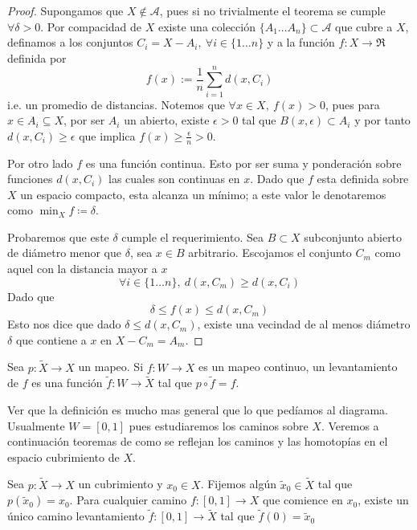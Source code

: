 \begin{proof}
  Supongamos que \(X \not \in \mathcal A\), pues si no trivialmente el
  teorema se cumple \(\forall \delta > 0\). Por compacidad de \(X\)
  existe una colección \(\{A_1 \dotsc A_n\} \subset \mathcal A\) que
  cubre a \(X\), definamos a los conjuntos \(C_i = X - A_i,\ \forall i
  \in \{1 \dotsc n\}\) y a la función \(f : X \to \Re\) definida por
  \[ f(x) := \frac 1 n \sum_{i=1}^{n} d(x, C_i) \]
  i.e. un promedio de distancias. Notemos que \(\forall x
  \in X,\ f(x) > 0\), pues para \(x \in A_i \subseteq X\), por ser
  \(A_i\) un abierto, existe \(\epsilon > 0\) tal que \(B(x,\epsilon)
  \subset A_i\) y por tanto \(d(x, C_i) \geq \epsilon\) que implica \(
  f(x) \geq \frac \epsilon n > 0\).

  Por otro lado \(f\) es una función continua. Esto por ser suma y
  ponderación sobre funciones \(d(x,C_i)\) las cuales son continuas en
  \(x\). Dado que \(f\) esta definida sobre \(X\) un espacio
  compacto, esta alcanza un mínimo; a este valor le denotaremos como
  \(\min_X f \coloneqq \delta \).

  Probaremos que este \(\delta\) cumple el requerimiento. Sea \(B
  \subset X\) subconjunto abierto de diámetro menor que \(\delta\), sea
  \(x \in B\) arbitrario. Escojamos el conjunto \(C_m\) como aquel con
  la distancia mayor a \(x\)
  \[ \forall i \in \{1 \dots n\}, \ d(x, C_m) \geq d(x, C_i) \]
  Dado que
  \[\delta \leq f(x) \leq d(x, C_m) \]
  Esto nos dice que dado \(\delta \leq d(x, C_m)\), existe una vecindad
  de al menos diámetro \(\delta\) que contiene a \(x\) en \(X - C_m = A_m\).
\end{proof}
\begin{definicion}[Levantamiento de \(f\)]
  Sea \(p : \tilde X \to X\) un mapeo. Si \(f : W \to X\) es un mapeo
  continuo, un levantamiento de \(f\) es una función \(\tilde f : W \to
  \tilde X\) tal que \(p \circ \tilde f = f\).
\end{definicion}
Ver que la definición es mucho mas general que lo que pedíamos al
diagrama. Usualmente \(W = [0,1]\) pues estudiaremos los caminos sobre
\(X\). Veremos a continuación teoremas de como se reflejan los caminos
y las homotopías en el espacio cubrimiento de \(X\).
\begin{teorema} \label{thm:lifting-theorem}
  Sea \(p : \tilde X \to X\) un cubrimiento y \(x_0 \in X\). Fijemos
  algún \(\tilde x _0 \in \tilde X\) tal que \(p(\tilde x _0) = x_0 \).
  Para cualquier camino \(f : [0,1] \to X\) que comience en \(x_0\), existe
  un único camino levantamiento \(\tilde f : [0,1] \to \tilde X\) tal que
  \(\tilde f (0) = \tilde x _0\)
\end{teorema}
